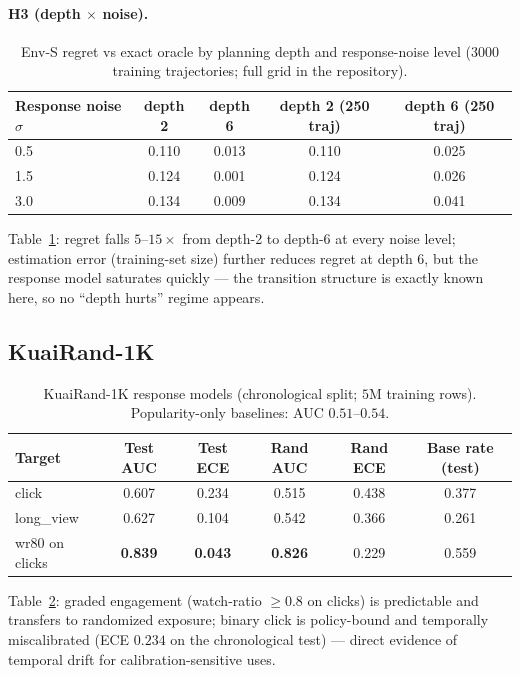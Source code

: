 \documentclass[11pt,a4paper]{article}
\begin{document}
\paragraph{H3 (depth $\times$ noise).}
\begin{table}[t]
\centering\small
\caption{Env-S regret vs exact oracle by planning depth and response-noise level
($3000$ training trajectories; full grid in the repository).}
\label{tab:h3}
\begin{tabular}{@{}lcccc@{}}
\toprule
Response noise $\sigma$ & depth 2 & depth 6 & depth 2 (250 traj) & depth 6 (250 traj) \\
\midrule
0.5 & 0.110 & 0.013 & 0.110 & 0.025 \\
1.5 & 0.124 & 0.001 & 0.124 & 0.026 \\
3.0 & 0.134 & 0.009 & 0.134 & 0.041 \\
\bottomrule
\end{tabular}
\end{table}

Table~\ref{tab:h3}: regret falls $5$--$15\times$ from depth-2 to depth-6 at every noise
level; estimation error (training-set size) further reduces regret at depth 6, but the
response model saturates quickly --- the transition structure is exactly known here, so
no ``depth hurts'' regime appears.

\subsection{KuaiRand-1K}

\begin{table}[t]
\centering\small
\caption{KuaiRand-1K response models (chronological split; $5$M training rows).
Popularity-only baselines: AUC $0.51$--$0.54$.}
\label{tab:kuairand}
\begin{tabular}{@{}lccccc@{}}
\toprule
Target & Test AUC & Test ECE & Rand AUC & Rand ECE & Base rate (test) \\
\midrule
click & 0.607 & 0.234 & 0.515 & 0.438 & 0.377 \\
long\_view & 0.627 & 0.104 & 0.542 & 0.366 & 0.261 \\
wr80 on clicks & \textbf{0.839} & \textbf{0.043} & \textbf{0.826} & 0.229 & 0.559 \\
\bottomrule
\end{tabular}
\end{table}

Table~\ref{tab:kuairand}: graded engagement (watch-ratio $\ge 0.8$ on clicks) is
predictable and transfers to randomized exposure; binary click is policy-bound and
temporally miscalibrated (ECE $0.234$ on the chronological test) --- direct evidence of
temporal drift for calibration-sensitive uses.
\end{document}
